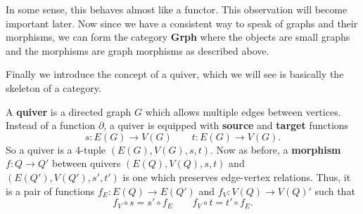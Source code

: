     \begin{center}
    \end{center}

    In some sense, this behaves almost like a functor. This observation 
    will become important later. 
    Now since we have a consistent way to speak of graphs and their
    morphisms, we can form the category \textbf{Grph} where the
    objects are small graphs and the morphisms are graph morphisms as
    described above. 

    Finally we introduce the concept of a quiver, which we will 
    see is basically the skeleton of a category. 

    \begin{definition}
        A \textbf{quiver} is a directed graph $G$ which allows multiple edges 
        between vertices. Instead of a function $\partial$, a quiver is equipped with 
        \textbf{source} and \textbf{target} functions 
        \[
            s: E(G) \to V(G) \qquad t: E(G) \to V(G).
        \]
        So a quiver is a 4-tuple $(E(G), V(G), s, t)$.
        Now as before, a \textbf{morphism} $f: Q \to Q'$ between quivers $(E(Q), V(Q), s, t)$ and 
        $(E(Q'), V(Q'), s', t')$ is one which preserves edge-vertex
        relations. Thus, it is a pair of functions $f_E: E(Q) \to E(Q')$ 
        and $f_V: V(Q) \to V(Q)'$ such that 
        \[
            f_V \circ s = s' \circ f_E \qquad f_V \circ t = t' \circ f_E.
        \]
    \end{definition}

